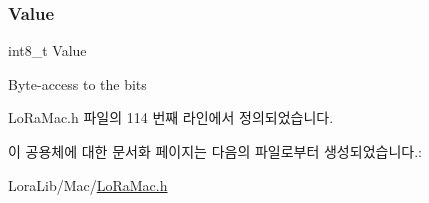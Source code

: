 \mbox{\label{unionu_dr_range_ae1e3e8696366e3256e397bbdc4e34775}} 
\subsubsection{\texorpdfstring{Value}{Value}}
{\footnotesize\ttfamily int8\+\_\+t Value}

Byte-\/access to the bits 

Lo\+Ra\+Mac.\+h 파일의 114 번째 라인에서 정의되었습니다.



이 공용체에 대한 문서화 페이지는 다음의 파일로부터 생성되었습니다.\+:\begin{DoxyCompactItemize}
\item 
Lora\+Lib/\+Mac/\mbox{\hyperlink{_lo_ra_mac_8h}{Lo\+Ra\+Mac.\+h}}\end{DoxyCompactItemize}
